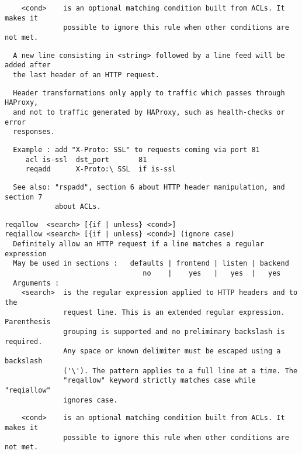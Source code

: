 \begin{verbatim}
    <cond>    is an optional matching condition built from ACLs. It makes it
              possible to ignore this rule when other conditions are not met.
\end{verbatim}

\begin{verbatim}
  A new line consisting in <string> followed by a line feed will be added after
  the last header of an HTTP request.
\end{verbatim}

\begin{verbatim}
  Header transformations only apply to traffic which passes through HAProxy,
  and not to traffic generated by HAProxy, such as health-checks or error
  responses.
\end{verbatim}

\begin{verbatim}
  Example : add "X-Proto: SSL" to requests coming via port 81
     acl is-ssl  dst_port       81
     reqadd      X-Proto:\ SSL  if is-ssl
\end{verbatim}

\begin{verbatim}
  See also: "rspadd", section 6 about HTTP header manipulation, and section 7
            about ACLs.
\end{verbatim}

\begin{verbatim}
reqallow  <search> [{if | unless} <cond>]
reqiallow <search> [{if | unless} <cond>] (ignore case)
  Definitely allow an HTTP request if a line matches a regular expression
  May be used in sections :   defaults | frontend | listen | backend
                                 no    |    yes   |   yes  |   yes
  Arguments :
    <search>  is the regular expression applied to HTTP headers and to the
              request line. This is an extended regular expression. Parenthesis
              grouping is supported and no preliminary backslash is required.
              Any space or known delimiter must be escaped using a backslash
              ('\'). The pattern applies to a full line at a time. The
              "reqallow" keyword strictly matches case while "reqiallow"
              ignores case.
\end{verbatim}

\begin{verbatim}
    <cond>    is an optional matching condition built from ACLs. It makes it
              possible to ignore this rule when other conditions are not met.
\end{verbatim}

